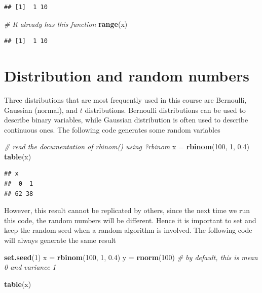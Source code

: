 \documentclass[
]{book}
\newenvironment{Shaded}{\begin{snugshade}}{\end{snugshade}}
\newcommand{\CommentTok}[1]{\textcolor[rgb]{0.56,0.35,0.01}{\textit{#1}}}
\newcommand{\DecValTok}[1]{\textcolor[rgb]{0.00,0.00,0.81}{#1}}
\newcommand{\FloatTok}[1]{\textcolor[rgb]{0.00,0.00,0.81}{#1}}
\newcommand{\KeywordTok}[1]{\textcolor[rgb]{0.13,0.29,0.53}{\textbf{#1}}}
\newcommand{\NormalTok}[1]{#1}
\newcommand{\StringTok}[1]{\textcolor[rgb]{0.31,0.60,0.02}{#1}}
\begin{document}
\begin{verbatim}
## [1]  1 10
\end{verbatim}

\begin{Shaded}
\begin{Highlighting}[]
  \CommentTok{# R already has this function}
  \KeywordTok{range}\NormalTok{(x)}
\end{Highlighting}
\end{Shaded}

\begin{verbatim}
## [1]  1 10
\end{verbatim}

\hypertarget{distribution-and-random-numbers}{%
\section{Distribution and random numbers}\label{distribution-and-random-numbers}}

Three distributions that are most frequently used in this course are Bernoulli, Gaussian (normal), and \(t\) distributions. Bernoulli distributions can be used to describe binary variables, while Gaussian distribution is often used to describe continuous ones. The following code generates some random variables

\begin{Shaded}
\begin{Highlighting}[]
  \CommentTok{# read the documentation of rbinom() using ?rbinom}
\NormalTok{  x =}\StringTok{ }\KeywordTok{rbinom}\NormalTok{(}\DecValTok{100}\NormalTok{, }\DecValTok{1}\NormalTok{, }\FloatTok{0.4}\NormalTok{)}
  \KeywordTok{table}\NormalTok{(x)}
\end{Highlighting}
\end{Shaded}

\begin{verbatim}
## x
##  0  1 
## 62 38
\end{verbatim}

However, this result cannot be replicated by others, since the next time we run this code, the random numbers will be different. Hence it is important to set and keep the random seed when a random algorithm is involved. The following code will always generate the same result

\begin{Shaded}
\begin{Highlighting}[]
  \KeywordTok{set.seed}\NormalTok{(}\DecValTok{1}\NormalTok{)}
\NormalTok{  x =}\StringTok{ }\KeywordTok{rbinom}\NormalTok{(}\DecValTok{100}\NormalTok{, }\DecValTok{1}\NormalTok{, }\FloatTok{0.4}\NormalTok{)}
\NormalTok{  y =}\StringTok{ }\KeywordTok{rnorm}\NormalTok{(}\DecValTok{100}\NormalTok{) }\CommentTok{# by default, this is mean 0 and variance 1}
  
  \KeywordTok{table}\NormalTok{(x)}
\end{Highlighting}
\end{Shaded}
\end{document}
